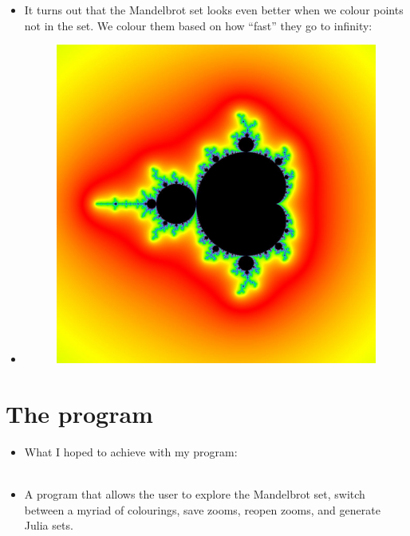 \documentclass{beamer}
\begin{document}
\frame
{
\begin{itemize}
\item <1->It turns out that the Mandelbrot set looks even better when we colour points not in the set. We colour them based on how ``fast'' they go to infinity:
\item <2-> \begin{figure}
\centering
\includegraphics[scale=0.15]{presentation_images/mandelbrot_coloured.jpg} %
\end{figure}
\end{itemize}
}

\section{The program}
\frame
{
\begin{itemize}
\item <1-> What I hoped to achieve with my program:\\\text{}\\
\item <2-> A program that allows the user to explore the Mandelbrot set, switch between a myriad of colourings, save zooms, reopen zooms, and generate Julia sets.
\end{itemize}
}
\end{document}
